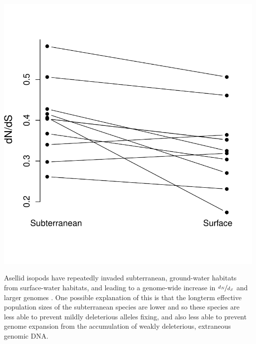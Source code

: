 { \begin{marginfigure}[-1cm]
 \begin{center}
 \includegraphics[width=\textwidth]{Journal_figs/drift_selection/asellid_isopods_Nes/asellid_isopods_Nes.pdf}
 \end{center}
 \caption{ Asellid isopods have repeatedly invaded subterranean, ground-water
habitats from surface-water habitats, and leading to a
genome-wide increase in $\nicefrac{d_N}{d_S}$  and larger genomes \citep[Data from ][comparing independent isopod species pairs]{lefebure2017less}. One
possible explanation of this is that the longterm effective population
sizes of the subterranean species are lower and so these species are less able to
prevent mildly deleterious alleles fixing, and also less able to prevent genome expansion from the accumulation of weakly deleterious, extraneous
genomic DNA.  } \label{fig: asellid_isopods_Nes}
 \end{marginfigure}


}
